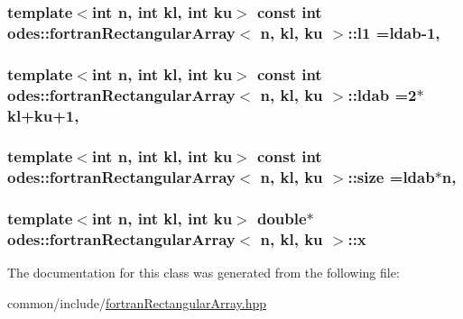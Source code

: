 \subsubsection[{l1}]{\setlength{\rightskip}{0pt plus 5cm}template$<$int n, int kl, int ku$>$ const int {\bf odes\+::fortran\+Rectangular\+Array}$<$ n, kl, ku $>$\+::l1 ={\bf ldab}-\/1\hspace{0.3cm}{\ttfamily [static]}, {\ttfamily [private]}}\label{classodes_1_1fortranRectangularArray_ad1d9e54651da99373857744ddfae77a6}
\hypertarget{classodes_1_1fortranRectangularArray_a71e7e0def95610ca1a1bc4c00e65b3cf}{}
\subsubsection[{ldab}]{\setlength{\rightskip}{0pt plus 5cm}template$<$int n, int kl, int ku$>$ const int {\bf odes\+::fortran\+Rectangular\+Array}$<$ n, kl, ku $>$\+::ldab =2$\ast$kl+ku+1\hspace{0.3cm}{\ttfamily [static]}, {\ttfamily [private]}}\label{classodes_1_1fortranRectangularArray_a71e7e0def95610ca1a1bc4c00e65b3cf}
\hypertarget{classodes_1_1fortranRectangularArray_a4827111315c99a9e0e80e98767fe21e3}{}
\subsubsection[{size}]{\setlength{\rightskip}{0pt plus 5cm}template$<$int n, int kl, int ku$>$ const int {\bf odes\+::fortran\+Rectangular\+Array}$<$ n, kl, ku $>$\+::size ={\bf ldab}$\ast$n\hspace{0.3cm}{\ttfamily [static]}, {\ttfamily [private]}}\label{classodes_1_1fortranRectangularArray_a4827111315c99a9e0e80e98767fe21e3}
\hypertarget{classodes_1_1fortranRectangularArray_a718a298ef74cd3ba533fc73ad739acc9}{}
\subsubsection[{x}]{\setlength{\rightskip}{0pt plus 5cm}template$<$int n, int kl, int ku$>$ double$\ast$ {\bf odes\+::fortran\+Rectangular\+Array}$<$ n, kl, ku $>$\+::x\hspace{0.3cm}{\ttfamily [private]}}\label{classodes_1_1fortranRectangularArray_a718a298ef74cd3ba533fc73ad739acc9}


The documentation for this class was generated from the following file\+:\begin{DoxyCompactItemize}
\item 
common/include/\hyperlink{fortranRectangularArray_8hpp}{fortran\+Rectangular\+Array.\+hpp}\end{DoxyCompactItemize}
